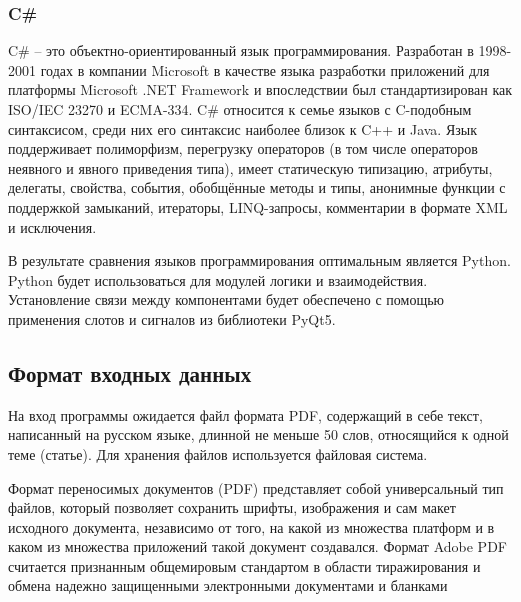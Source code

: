 \subsubsection{C\#}
C\# – это объектно-ориентированный язык программирования. Разработан в 1998-2001 годах в компании Microsoft в качестве языка разработки приложений для платформы Microsoft .NET Framework и впоследствии был стандартизирован как ISO/IEC 23270 и ECMA-334. C\# относится к семье языков с C-подобным синтаксисом, среди них его синтаксис наиболее близок к C++ и Java. 
Язык поддерживает полиморфизм, перегрузку операторов (в том числе операторов неявного и явного приведения типа), имеет статическую типизацию, атрибуты, делегаты, свойства, события, обобщённые методы и типы, анонимные функции с поддержкой замыканий, итераторы, LINQ-запросы,
комментарии в формате XML и исключения.

В результате сравнения языков программирования оптимальным является Python.
Python будет использоваться для модулей логики и взаимодействия.
Установление связи между компонентами будет обеспечено с помощью применения слотов и сигналов из библиотеки PyQt5.

\subsection{Формат входных данных}
На вход программы ожидается файл формата PDF, содержащий в себе текст, написанный на русском языке, длинной не меньше 50 слов, относящийся к одной теме (статье). Для хранения файлов используется файловая система.

Формат переносимых документов (PDF) представляет собой универсальный тип файлов, который позволяет сохранить шрифты, изображения и сам макет исходного документа, независимо от того, на какой из множества платформ и в каком из множества приложений такой документ создавался. 
Формат Adobe PDF считается признанным общемировым стандартом в области тиражирования и обмена надежно защищенными электронными документами и бланками \cite{23}

